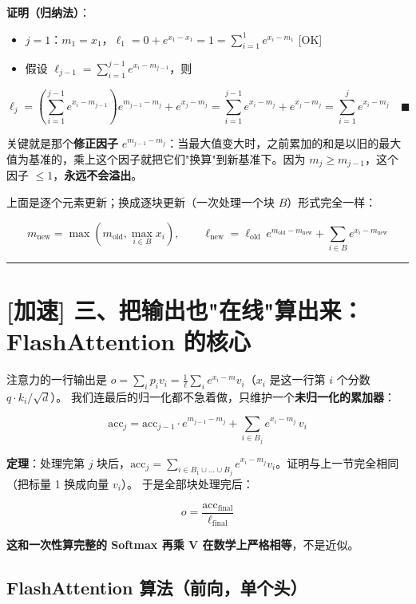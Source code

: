 \textbf{证明（归纳法）}：
\begin{itemize}
  \item $j = 1$：$m_1 = x_1$，$\ell_1 = 0 + e^{x_1 - x_1} = 1 = \sum_{i=1}^{1} e^{x_i - m_1}$ [OK]
  \item 假设 $\ell_{j-1} = \sum_{i=1}^{j-1} e^{x_i - m_{j-1}}$，则
\end{itemize}

\[
\ell_j = \left(\sum_{i=1}^{j-1} e^{x_i - m_{j-1}}\right) e^{m_{j-1} - m_j} + e^{x_j - m_j} = \sum_{i=1}^{j-1} e^{x_i - m_j} + e^{x_j - m_j} = \sum_{i=1}^{j} e^{x_i - m_j} \quad \blacksquare
\]

关键就是那个\textbf{修正因子} $e^{m_{j-1} - m_j}$：当最大值变大时，之前累加的和是以旧的最大值为基准的，乘上这个因子就把它们"换算"到新基准下。因为 $m_j \ge m_{j-1}$，这个因子 $\le 1$，\textbf{永远不会溢出}。

上面是逐个元素更新；换成逐块更新（一次处理一个块 $B$）形式完全一样：

\[
m_{\text{new}} = \max\left(m_{\text{old}}, \max_{i \in B} x_i\right), \qquad \ell_{\text{new}} = \ell_{\text{old}} \, e^{m_{\text{old}} - m_{\text{new}}} + \sum_{i \in B} e^{x_i - m_{\text{new}}}
\]

\vspace{0.8em}\hrule\vspace{0.8em}

\section{[加速] 三、把输出也"在线"算出来：FlashAttention 的核心}

注意力的一行输出是 $o = \sum_i p_i v_i = \frac{1}{\ell} \sum_i e^{x_i - m} v_i$（$x_i$ 是这一行第 $i$ 个分数 $q \cdot k_i / \sqrt{d}$）。
我们连最后的归一化都不急着做，只维护一个\textbf{未归一化的累加器}：

\[
\text{acc}_j = \text{acc}_{j-1} \cdot e^{m_{j-1} - m_j} + \sum_{i \in B_j} e^{x_i - m_j} \, v_i
\]

\textbf{定理}：处理完第 $j$ 块后，$\text{acc}_j = \sum_{i \in B_1 \cup \dots \cup B_j} e^{x_i - m_j} v_i$。证明与上一节完全相同（把标量 1 换成向量 $v_i$）。
于是全部块处理完后：

\[
o = \frac{\text{acc}_{\text{final}}}{\ell_{\text{final}}}
\]

\textbf{这和一次性算完整的 Softmax 再乘 V 在数学上严格相等}，不是近似。

\subsection{FlashAttention 算法（前向，单个头）}

